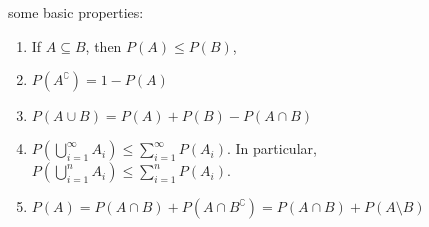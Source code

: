 \begin{theorem}
some basic properties:
\begin{enumerate}[noitemsep,topsep=0pt]
    \item If $A \subseteq B$, then $P(A) \leq P(B)$,
    \item $P(A^\complement) = 1 - P(A)$
    \item $P(A \cup B) = P(A) + P(B) - P(A \cap B)$
    \item $P(\bigcup_{i = 1}^{\infty} A_i) \leq \sum_{i=1}^{\infty} P(A_i)$.
          In particular, $P(\bigcup_{i=1}^{n} A_i) \leq \sum_{i=1}^{n} P(A_i)$.
    \item $P(A) = P(A \cap B) + P(A \cap B^\complement)
                = P(A \cap B) + P(A \setminus B)$
\end{enumerate}
\end{theorem}
